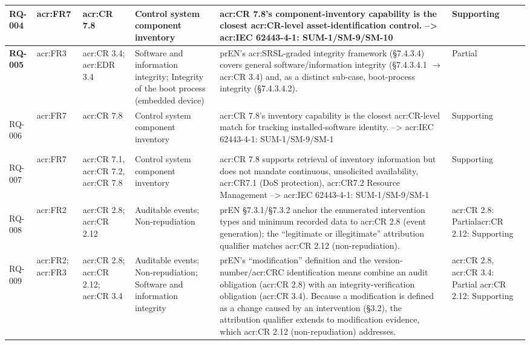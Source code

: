 \begin{longtable}{|>{\bfseries}p{1.0cm}|p{0.9cm}|p{2.4cm}|p{2.4cm}|p{4.8cm}|p{1.8cm}|}
	RQ-004 &
	\gls{acr:FR}7 &
	\gls{acr:CR} 7.8 &
	Control system component inventory &
	\gls{acr:CR} 7.8's component-inventory capability is the closest \gls{acr:CR}-level asset-identification control. --> \gls{acr:IEC} 62443-4-1: SUM-1/SM-9/SM-10 &
	Supporting \\
	\hline
	
	RQ-005 &
	\gls{acr:FR}3 &
	\gls{acr:CR} 3.4; \newline \gls{acr:EDR} 3.4 &
	Software and information integrity; Integrity of the boot process (embedded device) &
	prEN's \gls{acr:SRSL}-graded integrity framework (\S7.4.3.4) covers general software/information integrity (\S7.4.3.4.1 $\rightarrow$ \gls{acr:CR} 3.4) and, as a distinct sub-case, boot-process integrity (\S7.4.3.4.2).  &
	Partial \\
	\hline
	
	RQ-006 &
	\gls{acr:FR}7 &
	\gls{acr:CR} 7.8 &
	Control system component inventory &
	\gls{acr:CR} 7.8's inventory capability is the closest \gls{acr:CR}-level match for tracking installed-software identity. --> \gls{acr:IEC} 62443-4-1: SUM-1/SM-9/SM-1&
	Supporting \\
	\hline
	
	RQ-007 &
	\gls{acr:FR}7 &
	\gls{acr:CR} 7.1, \gls{acr:CR} 7.2, \gls{acr:CR} 7.8 &
	Control system component inventory &
	\gls{acr:CR} 7.8 supports retrieval of inventory information but does not mandate continuous, unsolicited availability, \gls{acr:CR}7.1 (DoS protection), \gls{acr:CR}7.2 Resource Management --> \gls{acr:IEC} 62443-4-1: SUM-1/SM-9/SM-1 &
	Supporting \\
	\hline
	
	RQ-008 &
	\gls{acr:FR}2 &
	\gls{acr:CR} 2.8; \newline \gls{acr:CR} 2.12 &
	Auditable events; Non-repudiation &
	prEN \S7.3.1/\S7.3.2 anchor the enumerated intervention types and minimum recorded data to \gls{acr:CR} 2.8 (event generation); the ``legitimate or illegitimate'' attribution qualifier matches \gls{acr:CR} 2.12 (non-repudiation). &
	\gls{acr:CR} 2.8: Partial\newline \gls{acr:CR} 2.12: Supporting \\
	\hline
	
	RQ-009 &
	\gls{acr:FR}2; \gls{acr:FR}3 &
	\gls{acr:CR} 2.8; \newline \gls{acr:CR} 2.12; \newline \gls{acr:CR} 3.4 &
	Auditable events; Non-repudiation; Software and information integrity &
	prEN's ``modification'' definition and the version-number/\gls{acr:CRC} identification means combine an audit obligation (\gls{acr:CR} 2.8) with an integrity-verification obligation (\gls{acr:CR} 3.4). Because a modification is defined as a change caused by an intervention (\S3.2), the attribution qualifier extends to modification evidence, which \gls{acr:CR} 2.12 (non-repudiation) addresses. &
	\gls{acr:CR} 2.8, \gls{acr:CR} 3.4: Partial \newline \gls{acr:CR} 2.12: Supporting \\
	\hline
	

\end{longtable}
